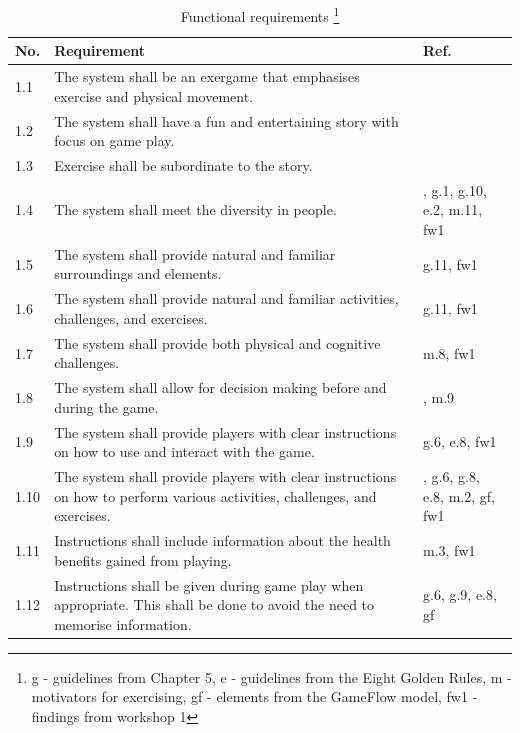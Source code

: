 \begin{minipage}{12 cm}
\begin{table} [H]
\centering
\begin{tabular}{|>{\raggedright}p{}|p{}|p{}|}
\hline
\textbf{No.} & \textbf{Requirement} &  \textbf{Ref.}\\ \hline
1.1 & The system shall be an exergame that emphasises exercise and physical movement. & \cite{project} \\ \hline
1.2 & The system shall have a fun and entertaining story with focus on game play.  & \cite{project} \cite{zyda2005visual} \\ \hline
1.3 & Exercise shall be subordinate to the story. & \cite{zyda2005visual} \\ \hline
1.4 & The system shall meet the diversity in people. & \cite{project}, g.1, g.10, e.2, m.11, fw1 \\ \hline
1.5 & The system shall provide natural and familiar surroundings and elements. & g.11, fw1\\ \hline
1.6 & The system shall provide natural and familiar activities, challenges, and exercises. & g.11, fw1 \\ \hline
1.7 & The system shall provide both physical and cognitive challenges. & m.8, fw1 \\ \hline
1.8 & The system shall allow for decision making before and during the game. & \cite{understandingvg}, m.9 \\ \hline
1.9 & The system shall provide players with clear instructions on how to use and interact with the game. & g.6, e.8, fw1 \\ \hline
1.10 & The system shall provide players with clear instructions on how to perform various activities, challenges, and exercises. & \cite{project}, g.6, g.8, e.8, m.2, gf, fw1\\ \hline
1.11 & Instructions shall include information about the health benefits gained from playing. & m.3, fw1\\ \hline
1.12 & Instructions shall be given during game play when appropriate. This shall be done to avoid the need to memorise information. & g.6, g.9, e.8, gf \\ \hline
    \end{tabular}
    \caption[Functional requirements, part 1]{Functional requirements \footnote{g - guidelines from Chapter 5, e - guidelines from the Eight Golden Rules, m - motivators for exercising, gf - elements from the GameFlow model, fw1 - findings from workshop 1}}
    \label{tab:func1}
\end{table} 
\end{minipage}

